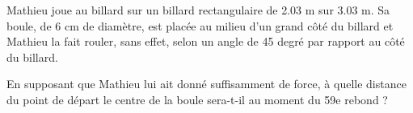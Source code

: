 Mathieu joue au billard sur un billard rectangulaire de 2.03 m sur 3.03 m. Sa boule, de 6 cm de diamètre, est placée au milieu d’un grand côté du billard et Mathieu la fait rouler, sans effet, selon un angle de 45 degré par rapport au côté du billard.

En supposant que Mathieu lui ait donné suffisamment de force, à quelle distance du point de départ le centre de la boule sera-t-il au moment du 59e rebond ?